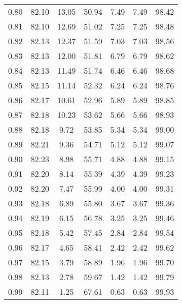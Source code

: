 \begin{tabular}{|c|c|c|c|c|c|c|}
      0.80 &     82.10 &     13.05 &      50.94 &    7.49 &       7.49 &         98.42 \\
      0.81 &     82.10 &     12.69 &      51.02 &    7.25 &       7.25 &         98.48 \\
      0.82 &     82.13 &     12.37 &      51.59 &    7.03 &       7.03 &         98.56 \\
      0.83 &     82.13 &     12.00 &      51.81 &    6.79 &       6.79 &         98.62 \\
      0.84 &     82.13 &     11.49 &      51.74 &    6.46 &       6.46 &         98.68 \\
      0.85 &     82.15 &     11.14 &      52.32 &    6.24 &       6.24 &         98.76 \\
      0.86 &     82.17 &     10.61 &      52.96 &    5.89 &       5.89 &         98.85 \\
      0.87 &     82.18 &     10.23 &      53.62 &    5.66 &       5.66 &         98.93 \\
      0.88 &     82.18 &      9.72 &      53.85 &    5.34 &       5.34 &         99.00 \\
      0.89 &     82.21 &      9.36 &      54.71 &    5.12 &       5.12 &         99.07 \\
      0.90 &     82.23 &      8.98 &      55.71 &    4.88 &       4.88 &         99.15 \\
      0.91 &     82.20 &      8.14 &      55.39 &    4.39 &       4.39 &         99.23 \\
      0.92 &     82.20 &      7.47 &      55.99 &    4.00 &       4.00 &         99.31 \\
      0.93 &     82.18 &      6.89 &      55.80 &    3.67 &       3.67 &         99.36 \\
      0.94 &     82.19 &      6.15 &      56.78 &    3.25 &       3.25 &         99.46 \\
      0.95 &     82.18 &      5.42 &      57.45 &    2.84 &       2.84 &         99.54 \\
      0.96 &     82.17 &      4.65 &      58.41 &    2.42 &       2.42 &         99.62 \\
      0.97 &     82.15 &      3.79 &      58.89 &    1.96 &       1.96 &         99.70 \\
      0.98 &     82.13 &      2.78 &      59.67 &    1.42 &       1.42 &         99.79 \\
      0.99 &     82.11 &      1.25 &      67.61 &    0.63 &       0.63 &         99.93 \\
\bottomrule
\end{tabular}
